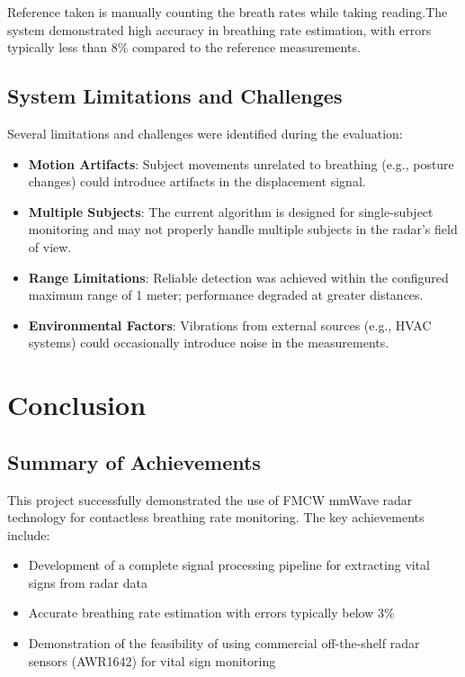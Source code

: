 \documentclass[12pt]{article}
\begin{document}
Reference taken is manually counting the breath rates while taking reading.The system demonstrated high accuracy in breathing rate estimation, with errors typically less than 8\% compared to the reference measurements.

\subsection{System Limitations and Challenges}
Several limitations and challenges were identified during the evaluation:

\begin{itemize}
    \item \textbf{Motion Artifacts}: Subject movements unrelated to breathing (e.g., posture changes) could introduce artifacts in the displacement signal.
    
    \item \textbf{Multiple Subjects}: The current algorithm is designed for single-subject monitoring and may not properly handle multiple subjects in the radar's field of view.
    
    \item \textbf{Range Limitations}: Reliable detection was achieved within the configured maximum range of 1 meter; performance degraded at greater distances.
    
    \item \textbf{Environmental Factors}: Vibrations from external sources (e.g., HVAC systems) could occasionally introduce noise in the measurements.
\end{itemize}

\section{Conclusion}

\subsection{Summary of Achievements}
This project successfully demonstrated the use of FMCW mmWave radar technology for contactless breathing rate monitoring. The key achievements include:

\begin{itemize}
    \item Development of a complete signal processing pipeline for extracting vital signs from radar data
    \item Accurate breathing rate estimation with errors typically below 3\%
    \item Demonstration of the feasibility of using commercial off-the-shelf radar sensors (AWR1642) for vital sign monitoring
\end{itemize}
\end{document}
